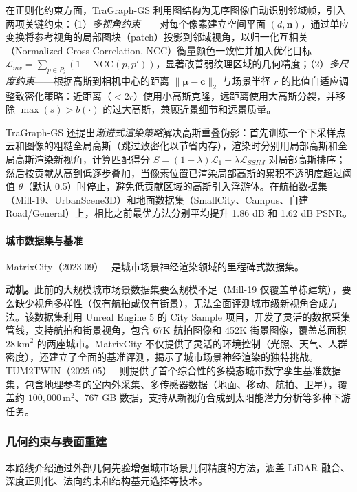 在正则化约束方面，TraGraph-GS 利用图结构为无序图像自动识别邻域帧，引入两项关键约束：（1）\emph{多视角约束}——对每个像素建立空间平面 $(d, \mathbf{n})$，通过单应变换将参考视角的局部图块（patch）投影到邻域视角，以归一化互相关（Normalized Cross-Correlation, NCC）衡量颜色一致性并加入优化目标 $\mathcal{L}_{mv} = \sum_{p \in P_i}(1 - \text{NCC}(p, p'))$，显著改善弱纹理区域的几何精度；（2）\emph{多尺度约束}——根据高斯到相机中心的距离 $\|\boldsymbol{\mu} - \mathbf{c}\|_2$ 与场景半径 $r$ 的比值自适应调整致密化策略：近距离（$< 2r$）使用小高斯克隆，远距离使用大高斯分裂，并移除 $\max(s) > b(\cdot)$ 的过大高斯，兼顾近景细节和远景质量。

TraGraph-GS 还提出\emph{渐进式渲染策略}解决高斯重叠伪影：首先训练一个下采样点云和图像的粗糙全局高斯（跳过致密化以节省内存），渲染时分别用局部高斯和全局高斯渲染新视角，计算匹配得分 $S = (1-\lambda)\mathcal{L}_1 + \lambda\mathcal{L}_{SSIM}$ 对局部高斯排序；然后按贡献从高到低逐步叠加，当像素位置已渲染局部高斯的累积不透明度超过阈值 $\theta$（默认 0.5）时停止，避免低贡献区域的高斯引入浮游体。在航拍数据集（Mill-19、UrbanScene3D）和地面数据集（SmallCity、Campus、自建 Road/General）上，相比之前最优方法分别平均提升 1.86 dB 和 1.62 dB PSNR。

\paragraph{城市数据集与基准}

MatrixCity（2023.09）~\cite{2309_16553} 是城市场景神经渲染领域的里程碑式数据集。

\textbf{动机。}此前的大规模城市场景数据集要么规模不足（Mill-19 仅覆盖单栋建筑），要么缺少视角多样性（仅有航拍或仅有街景），无法全面评测城市级新视角合成方法。该数据集利用 Unreal Engine 5 的 City Sample 项目，开发了灵活的数据采集管线，支持航拍和街景视角，包含 67K 航拍图像和 452K 街景图像，覆盖总面积 $28\,\text{km}^2$ 的两座城市。MatrixCity 不仅提供了灵活的环境控制（光照、天气、人群密度），还建立了全面的基准评测，揭示了城市场景神经渲染的独特挑战。TUM2TWIN（2025.05）~\cite{2505_07396} 则提供了首个综合性的多模态城市数字孪生基准数据集，包含地理参考的室内外采集、多传感器数据（地面、移动、航拍、卫星），覆盖约 $100{,}000\,\text{m}^2$、767 GB 数据，支持从新视角合成到太阳能潜力分析等多种下游任务。

\subsubsection{几何约束与表面重建}

本路线介绍通过外部几何先验增强城市场景几何精度的方法，涵盖 LiDAR 融合、深度正则化、法向约束和结构基元选择等技术。


